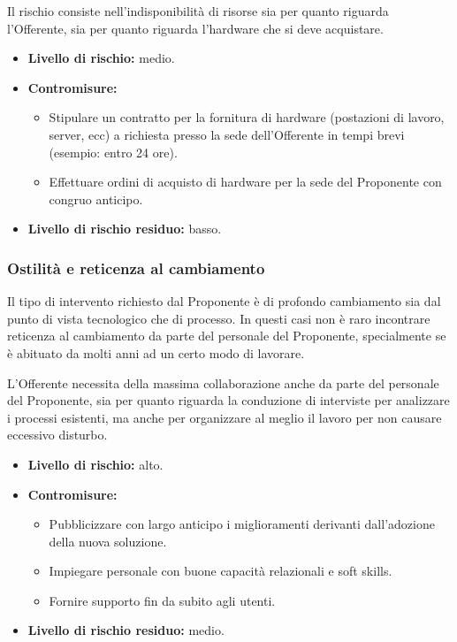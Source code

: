                     
                    Il rischio consiste nell'indisponibilità di risorse sia per quanto riguarda l'Offerente, sia per quanto riguarda l'hardware che si deve acquistare.
                    \begin{itemize}
                    	\item \textbf{Livello di rischio:} medio.
                        \item \textbf{Contromisure:} 
                        \begin{itemize}
                        	\item Stipulare un contratto per la fornitura di hardware (postazioni di lavoro, server, ecc) a richiesta presso la sede dell'Offerente in tempi brevi (esempio: entro 24 ore).
                            \item Effettuare ordini di acquisto di hardware per la sede del Proponente con congruo anticipo.
                        \end{itemize}
                        \item \textbf{Livello di rischio residuo:} basso.
                    \end{itemize}
                    
                    
				\subsubsection{Ostilità e reticenza al cambiamento}
                    Il tipo di intervento richiesto dal Proponente è di profondo cambiamento sia dal punto di vista tecnologico che di processo. In questi casi non è raro incontrare reticenza al cambiamento da parte del personale del Proponente, specialmente se è abituato da molti anni ad un certo modo di lavorare.
                    
                    
                    L'Offerente necessita della massima collaborazione anche da parte del personale del Proponente, sia per quanto riguarda la conduzione di interviste per analizzare i processi esistenti, ma anche per organizzare al meglio il lavoro per non causare eccessivo disturbo.
                    
                    \begin{itemize}
                    	\item \textbf{Livello di rischio:} alto.
                        \item \textbf{Contromisure:} 
                        \begin{itemize}
                        	\item Pubblicizzare con largo anticipo i miglioramenti derivanti dall'adozione della nuova soluzione.
                            \item Impiegare personale con buone capacità relazionali e soft skills.
                            \item Fornire supporto fin da subito agli utenti.
                        \end{itemize}
                        \item \textbf{Livello di rischio residuo:} medio.
                    \end{itemize}

